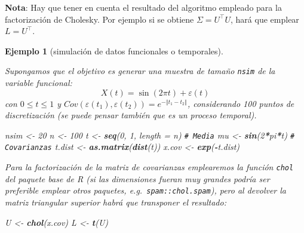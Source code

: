 \documentclass[
  spanish,
  10pt,
]{book}
\newenvironment{Shaded}{\begin{snugshade}}{\end{snugshade}}
\newcommand{\AttributeTok}[1]{\textcolor[rgb]{0.13,0.29,0.53}{#1}}
\newcommand{\CommentTok}[1]{\textcolor[rgb]{0.56,0.35,0.01}{\textit{#1}}}
\newcommand{\DecValTok}[1]{\textcolor[rgb]{0.00,0.00,0.81}{#1}}
\newcommand{\FunctionTok}[1]{\textcolor[rgb]{0.13,0.29,0.53}{\textbf{#1}}}
\newcommand{\NormalTok}[1]{#1}
\newcommand{\OtherTok}[1]{\textcolor[rgb]{0.56,0.35,0.01}{#1}}
\newcommand{\SpecialCharTok}[1]{\textcolor[rgb]{0.81,0.36,0.00}{\textbf{#1}}}
\theoremstyle{break}
\newtheorem{example}{Ejemplo}[chapter]
\theoremstyle{nonumberplain}
\renewcommand{\CommentTok}[1]{\textcolor[rgb]{0.41,0.41,0.41}{\texttt{#1}}}
\begin{document}
\textbf{Nota}: Hay que tener en cuenta el resultado del algoritmo empleado
para la factorización de Cholesky. Por ejemplo si se obtiene \(\Sigma=U^{\top}U\),
hará que emplear \(L=U^{\top}.\)

\begin{example}[simulación de datos funcionales o temporales]
\protect\hypertarget{exm:funcional}{}\label{exm:funcional}

Supongamos que el objetivo es generar una muestra de tamaño \texttt{nsim} de la variable funcional:
\[X(t)= \sin\left(  2\pi t\right)  +\varepsilon\left(  t\right)\]
con \(0\leq t \leq1\) y \(Cov(\varepsilon\left( t_1 \right) ,
\varepsilon\left( t_2 \right) ) = e^{-\left\Vert t_1-t_2 \right\Vert }\),
considerando 100 puntos de discretización (se puede pensar también que es un proceso temporal).

\begin{Shaded}
\begin{Highlighting}[]
\NormalTok{nsim }\OtherTok{\textless{}{-}} \DecValTok{20}
\NormalTok{n }\OtherTok{\textless{}{-}} \DecValTok{100}
\NormalTok{t }\OtherTok{\textless{}{-}} \FunctionTok{seq}\NormalTok{(}\DecValTok{0}\NormalTok{, }\DecValTok{1}\NormalTok{, }\AttributeTok{length =}\NormalTok{ n)}
\CommentTok{\# Media}
\NormalTok{mu }\OtherTok{\textless{}{-}} \FunctionTok{sin}\NormalTok{(}\DecValTok{2}\SpecialCharTok{*}\NormalTok{pi}\SpecialCharTok{*}\NormalTok{t)}
\CommentTok{\# Covarianzas}
\NormalTok{t.dist }\OtherTok{\textless{}{-}} \FunctionTok{as.matrix}\NormalTok{(}\FunctionTok{dist}\NormalTok{(t))}
\NormalTok{x.cov }\OtherTok{\textless{}{-}} \FunctionTok{exp}\NormalTok{(}\SpecialCharTok{{-}}\NormalTok{t.dist)}
\end{Highlighting}
\end{Shaded}

Para la factorización de la matriz de covarianzas emplearemos la función \texttt{chol}
del paquete base de R (si las dimensiones fueran muy grandes podría ser preferible emplear
otros paquetes, e.g.~\texttt{spam::chol.spam}), pero al devolver la matriz triangular superior
habrá que transponer el resultado:

\begin{Shaded}
\begin{Highlighting}[]
\NormalTok{U }\OtherTok{\textless{}{-}} \FunctionTok{chol}\NormalTok{(x.cov)}
\NormalTok{L }\OtherTok{\textless{}{-}} \FunctionTok{t}\NormalTok{(U)}
\end{Highlighting}
\end{Shaded}


\end{example}
\end{document}
